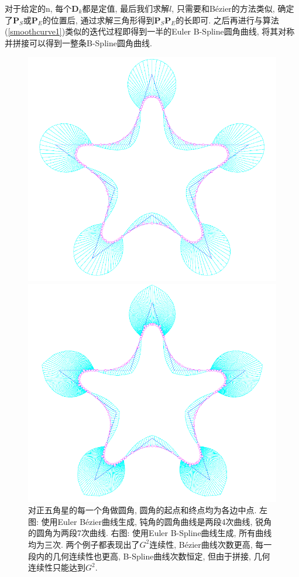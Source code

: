 \documentclass[utf8]{ctexart} %
\numberwithin{figure}{section}
\numberwithin{equation}{section}
\begin{document}
	对于给定的n, 每个$\boldsymbol{D}_k$都是定值, 最后我们求解$l$, 只需要和B\'ezier的方法类似, 确定了$\boldsymbol{P}_S$或$\boldsymbol{P}_E$的位置后, 通过求解三角形得到$\boldsymbol{P}_S\boldsymbol{P}_E$的长即可. 之后再进行与算法(\ref{smoothcurve1})类似的迭代过程即得到一半的Euler B-Spline圆角曲线, 将其对称并拼接可以得到一整条B-Spline圆角曲线.
	\begin{figure}[htbp]
		\centering
		\begin{minipage}{0.49\linewidth}
			\centering
			\includegraphics[width=0.9\linewidth]{figures/SmoothingCorner3.png}
		\end{minipage}
		\begin{minipage}{0.49\linewidth}
			\centering
			\includegraphics[width=0.9\linewidth]{figures/SmoothingCorner4.png}
		\end{minipage}
	
		\caption{\small{对正五角星的每一个角做圆角, 圆角的起点和终点均为各边中点. 左图: 使用Euler B\'ezier曲线生成, 钝角的圆角曲线是两段4次曲线, 锐角的圆角为两段7次曲线. 右图: 使用Euler B-Spline曲线生成, 所有曲线均为三次. 两个例子都表现出了$G^2$连续性, B\'ezier曲线次数更高, 每一段内的几何连续性也更高, B-Spline曲线次数恒定, 但由于拼接, 几何连续性只能达到$G^2$.}}
		\label{pentagram}
	\end{figure}
\end{document}
